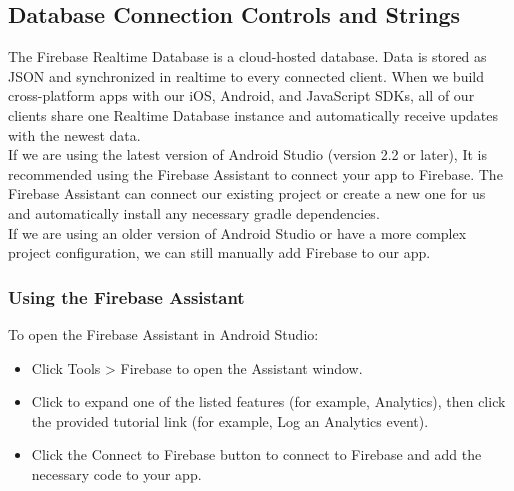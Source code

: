 	\subsection{Database Connection Controls and Strings}
	The Firebase Realtime Database is a cloud-hosted database. Data is stored as JSON and synchronized in realtime to every connected client. When we build cross-platform apps with our iOS, Android, and JavaScript SDKs, all of our clients share one Realtime Database instance and automatically receive updates with the newest data. \\
	
	If we are using the latest version of Android Studio (version 2.2 or later), It is recommended using the Firebase Assistant to connect your app to Firebase. The Firebase Assistant can connect our existing project or create a new one for us and automatically install any necessary gradle dependencies.\\
	
	If we are using an older version of Android Studio or have a more complex project configuration, we can still manually add Firebase to our app.
	
		\subsubsection{Using the Firebase Assistant}
		
		To open the Firebase Assistant in Android Studio:
		\begin{itemize}
			\item Click Tools > Firebase to open the Assistant window.
			\item Click to expand one of the listed features (for example, Analytics), then click the provided tutorial link (for example, Log an Analytics event).
			\item Click the Connect to Firebase button to connect to Firebase and add the necessary code to your app.
		\end{itemize}
	
